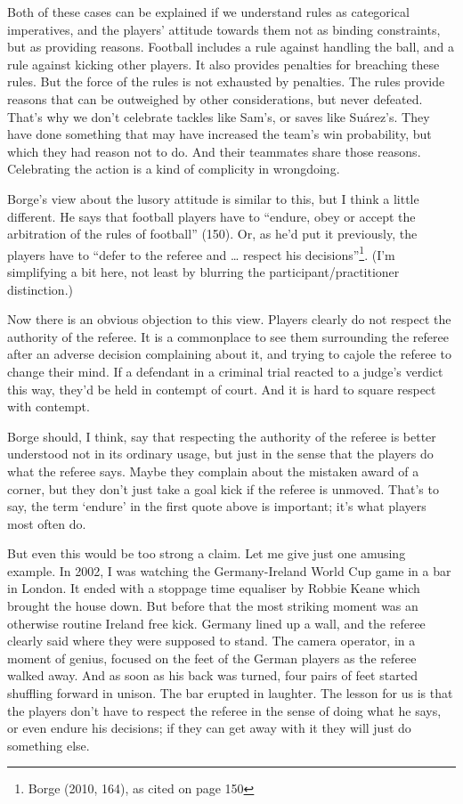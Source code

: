 \documentclass[
  12pt,
]{article}
\begin{document}
Both of these cases can be explained if we understand rules as categorical imperatives, and the players' attitude towards them not as binding constraints, but as providing reasons. Football includes a rule against handling the ball, and a rule against kicking other players. It also provides penalties for breaching these rules. But the force of the rules is not exhausted by penalties. The rules provide reasons that can be outweighed by other considerations, but never defeated. That's why we don't celebrate tackles like Sam's, or saves like Suárez's. They have done something that may have increased the team's win probability, but which they had reason not to do. And their teammates share those reasons. Celebrating the action is a kind of complicity in wrongdoing.

Borge's view about the lusory attitude is similar to this, but I think a little different. He says that football players have to ``endure, obey or accept the arbitration of the rules of football'' (150). Or, as he'd put it previously, the players have to ``defer to the referee and \ldots{} respect his decisions''\footnote{Borge (2010, 164), as cited on page 150}. (I'm simplifying a bit here, not least by blurring the participant/practitioner distinction.)

Now there is an obvious objection to this view. Players clearly do not respect the authority of the referee. It is a commonplace to see them surrounding the referee after an adverse decision complaining about it, and trying to cajole the referee to change their mind. If a defendant in a criminal trial reacted to a judge's verdict this way, they'd be held in contempt of court. And it is hard to square respect with contempt.

Borge should, I think, say that respecting the authority of the referee is better understood not in its ordinary usage, but just in the sense that the players do what the referee says. Maybe they complain about the mistaken award of a corner, but they don't just take a goal kick if the referee is unmoved. That's to say, the term `endure' in the first quote above is important; it's what players most often do.

But even this would be too strong a claim. Let me give just one amusing example. In 2002, I was watching the Germany-Ireland World Cup game in a bar in London. It ended with a stoppage time equaliser by Robbie Keane which brought the house down. But before that the most striking moment was an otherwise routine Ireland free kick. Germany lined up a wall, and the referee clearly said where they were supposed to stand. The camera operator, in a moment of genius, focused on the feet of the German players as the referee walked away. And as soon as his back was turned, four pairs of feet started shuffling forward in unison. The bar erupted in laughter. The lesson for us is that the players don't have to respect the referee in the sense of doing what he says, or even endure his decisions; if they can get away with it they will just do something else.
\end{document}
